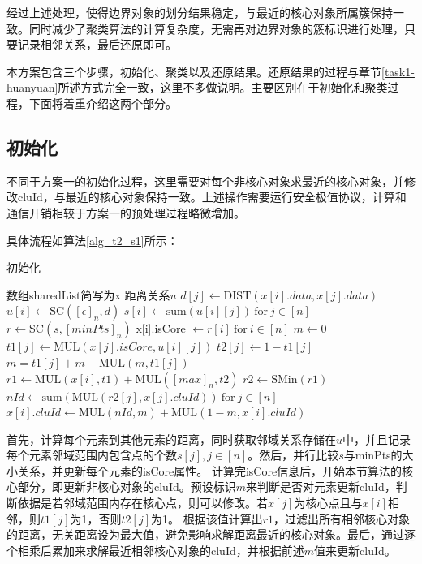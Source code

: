 经过上述处理，使得边界对象的划分结果稳定，与最近的核心对象所属簇保持一致。同时减少了聚类算法的计算复杂度，无需再对边界对象的簇标识进行处理，只要记录相邻关系，最后还原即可。

本方案包含三个步骤，初始化、聚类以及还原结果。还原结果的过程与章节\ref{task1-huanyuan}所述方式完全一致，这里不多做说明。主要区别在于初始化和聚类过程，下面将着重介绍这两个部分。

\subsection{初始化}
不同于方案一的初始化过程，这里需要对每个非核心对象求最近的核心对象，并修改cluId，与最近的核心对象保持一致。上述操作需要运行安全极值协议，计算和通信开销相较于方案一的预处理过程略微增加。

具体流程如算法\ref{alg_t2_s1}所示：
\begin{algorithm}[htbp]
	\renewcommand{\algorithmicrequire}{\textbf{输入:}}
	\renewcommand{\algorithmicensure}{\textbf{输出:}}
	\caption{初始化}
	\label{alg_t2_s1}
	\begin{algorithmic}[1]
		\REQUIRE 数组sharedList简写为x
		\ENSURE 距离关系$ u $
		\STATE $ d[j] \leftarrow \text{DIST}(x[i].data, x[j].data) $
		\ENDFOR
		\STATE $ u[i] \leftarrow \text{SC}([\epsilon]_n, d) $
		\STATE $ s[i] \leftarrow \text{sum}(u[i][j])\ \text{for}\ j\in[n]$
		\ENDFOR
		\STATE $ r \leftarrow \text{SC}(s, [minPts]_n) $
		\STATE x[i].isCore $\leftarrow r[i]\ \text{for}\ i\in[n] $
		\STATE $ m \leftarrow 0 $
		\STATE $ t1[j] \leftarrow \text{MUL}(x[j].isCore, u[i][j]) $
		\STATE $ t2[j] \leftarrow 1-t1[j] $
		\STATE $ m = t1[j] + m - \text{MUL}(m, t1[j]) $
		\ENDFOR
		\STATE $ r1 \leftarrow \text{MUL}(x[i], t1) + \text{MUL}([max]_n, t2) $
		\STATE $ r2 \leftarrow \text{SMin}(r1) $
		\STATE $ nId \leftarrow \text{sum}(\text{MUL}(r2[j], x[j].cluId))\ \text{for}\ j \in [n] $
		\STATE $ x[i].cluId \leftarrow \text{MUL}(nId, m) + \text{MUL}(1-m, x[i].cluId)$
		\ENDFOR
	\end{algorithmic}
\end{algorithm}

首先，计算每个元素到其他元素的距离，同时获取邻域关系存储在$ u $中，并且记录每个元素邻域范围内包含点的个数$ s[j],j\in[n] $。然后，并行比较$ s $与minPts的大小关系，并更新每个元素的isCore属性。
计算完isCore信息后，开始本节算法的核心部分，即更新非核心对象的cluId。预设标识$ m $来判断是否对元素更新cluId，判断依据是若邻域范围内存在核心点，则可以修改。若$ x[j] $为核心点且与$ x[i] $相邻，则$ t1[j] $为1，否则$ t2[j] $为1。
根据该值计算出$ r1 $，过滤出所有相邻核心对象的距离，无关距离设为最大值，避免影响求解距离最近的核心对象。最后，通过逐个相乘后累加来求解最近相邻核心对象的cluId，并根据前述$ m $值来更新cluId。

